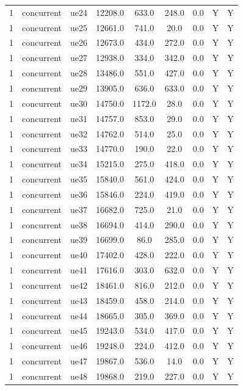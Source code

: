 \begin{table}[ht]
\begin{tabular}{|c|c|c|c|c|c|c|c|c|}
1 & concurrent & ue24 & 12208.0 & 633.0 & 248.0 & 0.0 & Y & Y \\
1 & concurrent & ue25 & 12661.0 & 741.0 & 20.0 & 0.0 & Y & Y \\
1 & concurrent & ue26 & 12673.0 & 434.0 & 272.0 & 0.0 & Y & Y \\
1 & concurrent & ue27 & 12938.0 & 334.0 & 342.0 & 0.0 & Y & Y \\
1 & concurrent & ue28 & 13486.0 & 551.0 & 427.0 & 0.0 & Y & Y \\
1 & concurrent & ue29 & 13905.0 & 636.0 & 633.0 & 0.0 & Y & Y \\
1 & concurrent & ue30 & 14750.0 & 1172.0 & 28.0 & 0.0 & Y & Y \\
1 & concurrent & ue31 & 14757.0 & 853.0 & 29.0 & 0.0 & Y & Y \\
1 & concurrent & ue32 & 14762.0 & 514.0 & 25.0 & 0.0 & Y & Y \\
1 & concurrent & ue33 & 14770.0 & 190.0 & 22.0 & 0.0 & Y & Y \\
1 & concurrent & ue34 & 15215.0 & 275.0 & 418.0 & 0.0 & Y & Y \\
1 & concurrent & ue35 & 15840.0 & 561.0 & 424.0 & 0.0 & Y & Y \\
1 & concurrent & ue36 & 15846.0 & 224.0 & 419.0 & 0.0 & Y & Y \\
1 & concurrent & ue37 & 16682.0 & 725.0 & 21.0 & 0.0 & Y & Y \\
1 & concurrent & ue38 & 16694.0 & 414.0 & 290.0 & 0.0 & Y & Y \\
1 & concurrent & ue39 & 16699.0 & 86.0 & 285.0 & 0.0 & Y & Y \\
1 & concurrent & ue40 & 17402.0 & 428.0 & 222.0 & 0.0 & Y & Y \\
1 & concurrent & ue41 & 17616.0 & 303.0 & 632.0 & 0.0 & Y & Y \\
1 & concurrent & ue42 & 18461.0 & 816.0 & 212.0 & 0.0 & Y & Y \\
1 & concurrent & ue43 & 18459.0 & 458.0 & 214.0 & 0.0 & Y & Y \\
1 & concurrent & ue44 & 18665.0 & 305.0 & 369.0 & 0.0 & Y & Y \\
1 & concurrent & ue45 & 19243.0 & 534.0 & 417.0 & 0.0 & Y & Y \\
1 & concurrent & ue46 & 19248.0 & 224.0 & 412.0 & 0.0 & Y & Y \\
1 & concurrent & ue47 & 19867.0 & 536.0 & 14.0 & 0.0 & Y & Y \\
1 & concurrent & ue48 & 19868.0 & 219.0 & 227.0 & 0.0 & Y & Y \\

\end{tabular}
\end{table}
